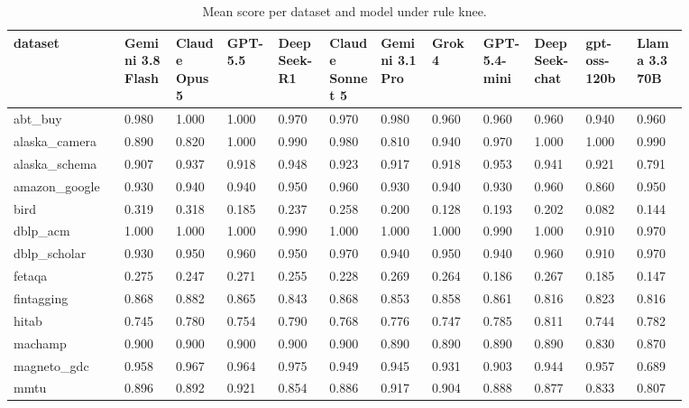 \begin{landscape}
\tiny
\setlength{\tabcolsep}{3pt}
\begin{longtable}{p{0.134\linewidth}p{0.067\linewidth}p{0.067\linewidth}p{0.067\linewidth}p{0.067\linewidth}p{0.067\linewidth}p{0.067\linewidth}p{0.067\linewidth}p{0.067\linewidth}p{0.067\linewidth}p{0.067\linewidth}p{0.067\linewidth}}
\caption{Mean score per dataset and model under rule knee.}\label{tab:per_dataset_mean_pareto_knee}\\
\toprule
dataset & Gemini 3.8 Flash & Claude Opus 5 & GPT-5.5 & DeepSeek-R1 & Claude Sonnet 5 & Gemini 3.1 Pro & Grok 4 & GPT-5.4-mini & DeepSeek-chat & gpt-oss-120b & Llama 3.3 70B \\
\midrule
abt\_\allowbreak{}buy & 0.980 & 1.000 & 1.000 & 0.970 & 0.970 & 0.980 & 0.960 & 0.960 & 0.960 & 0.940 & 0.960 \\
alaska\_\allowbreak{}camera & 0.890 & 0.820 & 1.000 & 0.990 & 0.980 & 0.810 & 0.940 & 0.970 & 1.000 & 1.000 & 0.990 \\
alaska\_\allowbreak{}schema & 0.907 & 0.937 & 0.918 & 0.948 & 0.923 & 0.917 & 0.918 & 0.953 & 0.941 & 0.921 & 0.791 \\
amazon\_\allowbreak{}google & 0.930 & 0.940 & 0.940 & 0.950 & 0.960 & 0.930 & 0.940 & 0.930 & 0.960 & 0.860 & 0.950 \\
bird & 0.319 & 0.318 & 0.185 & 0.237 & 0.258 & 0.200 & 0.128 & 0.193 & 0.202 & 0.082 & 0.144 \\
dblp\_\allowbreak{}acm & 1.000 & 1.000 & 1.000 & 0.990 & 1.000 & 1.000 & 1.000 & 0.990 & 1.000 & 0.910 & 0.970 \\
dblp\_\allowbreak{}scholar & 0.930 & 0.950 & 0.960 & 0.950 & 0.970 & 0.940 & 0.950 & 0.940 & 0.960 & 0.910 & 0.970 \\
fetaqa & 0.275 & 0.247 & 0.271 & 0.255 & 0.228 & 0.269 & 0.264 & 0.186 & 0.267 & 0.185 & 0.147 \\
fintagging & 0.868 & 0.882 & 0.865 & 0.843 & 0.868 & 0.853 & 0.858 & 0.861 & 0.816 & 0.823 & 0.816 \\
hitab & 0.745 & 0.780 & 0.754 & 0.790 & 0.768 & 0.776 & 0.747 & 0.785 & 0.811 & 0.744 & 0.782 \\
machamp & 0.900 & 0.900 & 0.900 & 0.900 & 0.900 & 0.890 & 0.890 & 0.890 & 0.890 & 0.830 & 0.870 \\
magneto\_\allowbreak{}gdc & 0.958 & 0.967 & 0.964 & 0.975 & 0.949 & 0.945 & 0.931 & 0.903 & 0.944 & 0.957 & 0.689 \\
mmtu & 0.896 & 0.892 & 0.921 & 0.854 & 0.886 & 0.917 & 0.904 & 0.888 & 0.877 & 0.833 & 0.807 \\

\end{longtable}
\end{landscape}
